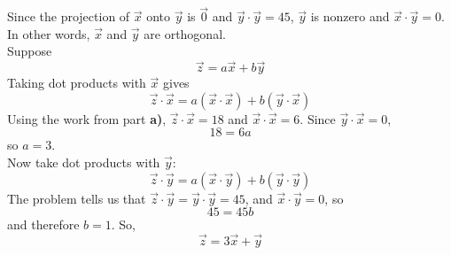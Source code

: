 \documentclass[11pt]{article}
\begin{document}
\begin{prob}
\begin{subprob}
\begin{solution}
Since the projection of $\vec{x}$ onto $\vec{y}$ is $\vec{0}$ and $\vec{y}\cdot\vec{y}=45$, $\vec{y}$ is nonzero and $\vec{x}\cdot\vec{y}=0$. In other words, $\vec{x}$ and $\vec{y}$ are orthogonal. \\

Suppose
\[
\vec{z}=a\vec{x}+b\vec{y}
\]
Taking dot products with $\vec{x}$ gives
\[
\vec{z}\cdot\vec{x}=a(\vec{x}\cdot\vec{x})+b(\vec{y}\cdot\vec{x})
\]
Using the work from part \textbf{a)}, $\vec{z}\cdot\vec{x}=18$ and $\vec{x}\cdot\vec{x}=6$. Since $\vec{y}\cdot\vec{x}=0$,
\[
18 = 6a
\]
so $a=3$. \\

Now take dot products with $\vec{y}$:
\[
\vec{z}\cdot\vec{y}=a(\vec{x}\cdot\vec{y})+b(\vec{y}\cdot\vec{y})
\]
The problem tells us that $\vec{z}\cdot\vec{y}=\vec{y}\cdot\vec{y}=45$, and $\vec{x}\cdot\vec{y}=0$, so
\[
45=45b
\]
and therefore $b=1$. So,
\[
\vec{z}=3\vec{x}+\vec{y}
\]
\end{solution}
\end{subprob}
\end{prob}

\newpage
\end{document}

